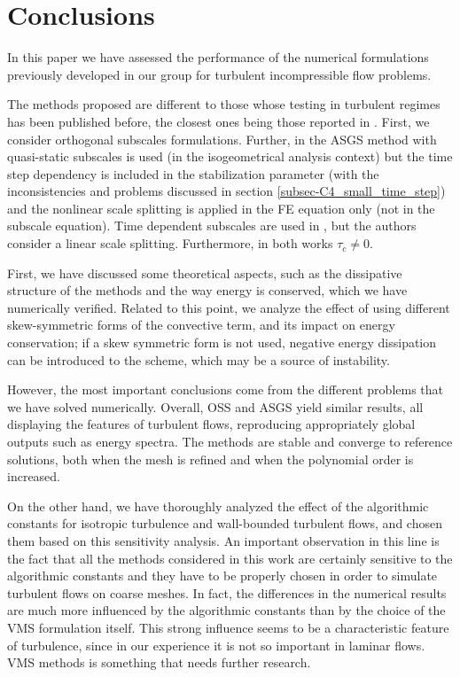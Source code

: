 \section{Conclusions}
\label{sec-C4_conclusions}

In this paper we have assessed the performance of the numerical formulations previously developed in our group \cite{codina_stabilized_2002,codina_time_2007,Codina-chap-2011,Principe2009} for turbulent incompressible flow problems. 

The methods proposed are different to those whose testing in turbulent regimes has been published before, the closest ones being those reported in \cite{bazilevs_variational_2007,gamnitzer_time-dependent_2010}. First, we consider orthogonal subscales formulations. Further, in \cite{bazilevs_variational_2007} the ASGS method with quasi-static subscales is used (in the isogeometrical analysis context) but the time step dependency is included in the stabilization parameter (with the inconsistencies and problems discussed in section \ref{subsec-C4_small_time_step}) and the nonlinear scale splitting is applied in the FE equation only (not in the subscale equation). Time dependent subscales are used in \cite{gamnitzer_time-dependent_2010}, but the authors consider a linear scale splitting. Furthermore, in both works $\tau_c \neq 0$. 

First, we have discussed some theoretical aspects, such as the dissipative structure of the methods and the way energy is conserved, which we have numerically verified. Related to this point, we analyze the effect of using different skew-symmetric forms of the convective term, and its impact on energy conservation; if a skew symmetric form is not used, negative energy dissipation can be introduced to the scheme, which may be a source of instability. 

However, the most important conclusions come from the different problems that we have solved numerically. Overall, OSS and ASGS yield similar results, all displaying the features of turbulent flows, reproducing appropriately global outputs such as energy spectra. The methods are stable and converge to reference solutions, both when the mesh is refined and when the polynomial order is increased. 

On the other hand, we have thoroughly analyzed the effect of the algorithmic constants for isotropic turbulence and wall-bounded turbulent flows, and chosen them based on this sensitivity analysis. An important observation in this line is the fact that all the methods considered in this work are certainly sensitive to the algorithmic constants and they have to be properly chosen in order to simulate turbulent flows on coarse meshes. In fact, the differences in the numerical results are much more influenced by the algorithmic constants than by the choice of the VMS formulation itself.  This strong influence seems to be a characteristic feature of turbulence, since in our experience it is not so important in laminar flows. VMS methods is something that needs further research.

